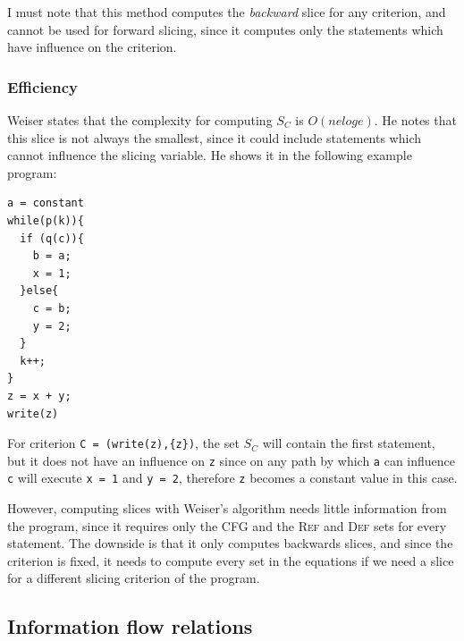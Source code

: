 \documentclass[oneside,12pt,a4paper]{book}
\begin{document}
I must note that this method computes the \textit{backward} slice for any criterion, and cannot be used for forward slicing, since it computes only the statements which have influence on the criterion.

\subsubsection{Efficiency}
Weiser states that the complexity for computing $S_C$ is $O(n e log e)$. He notes that this slice is not always the smallest, since it could include statements which cannot influence the slicing variable. He shows it in the following example program:
\begin{lstlisting}
a = constant
while(p(k)){
  if (q(c)){
    b = a;
    x = 1;
  }else{
  	c = b;
  	y = 2;
  }
  k++;
}
z = x + y;
write(z)
\end{lstlisting}

For criterion \texttt{C = (write(z),\{z\})}, the set $S_C$ will contain the first statement, but it does not have an influence on \texttt{z} since on any path by which \texttt{a} can influence \texttt{c} will execute \texttt{x = 1} and \texttt{y = 2}, therefore \texttt{z} becomes a constant value in this case. 

However, computing slices with Weiser's algorithm needs little information from the program, since it requires only the CFG and the \textsc{Ref} and \textsc{Def} sets for every statement.
The downside is that it only computes backwards slices, and since the criterion is fixed, it needs to compute every set in the equations if we need a slice for a different slicing criterion of the program.

\subsection{Information flow relations}
\end{document}
